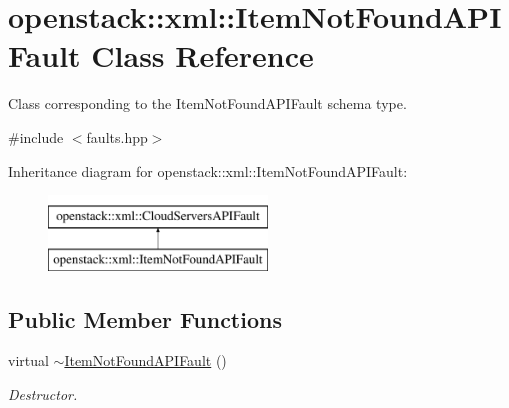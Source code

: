 \hypertarget{classopenstack_1_1xml_1_1ItemNotFoundAPIFault}{
\section{openstack::xml::ItemNotFoundAPIFault Class Reference}
\label{classopenstack_1_1xml_1_1ItemNotFoundAPIFault}
}


Class corresponding to the ItemNotFoundAPIFault schema type.  




{\ttfamily \#include $<$faults.hpp$>$}

Inheritance diagram for openstack::xml::ItemNotFoundAPIFault:\begin{figure}[H]
\begin{center}
\leavevmode
\includegraphics[height=2.000000cm]{classopenstack_1_1xml_1_1ItemNotFoundAPIFault}
\end{center}
\end{figure}
\subsection*{Public Member Functions}
\begin{DoxyCompactItemize}
\item 
\hypertarget{classopenstack_1_1xml_1_1ItemNotFoundAPIFault_a3392409244812daff8fed7aad3f75441}{
virtual \hyperlink{classopenstack_1_1xml_1_1ItemNotFoundAPIFault_a3392409244812daff8fed7aad3f75441}{$\sim$ItemNotFoundAPIFault} ()}
\label{classopenstack_1_1xml_1_1ItemNotFoundAPIFault_a3392409244812daff8fed7aad3f75441}

\begin{DoxyCompactList}\small\item\em Destructor. \item\end{DoxyCompactList}\end{DoxyCompactItemize}
